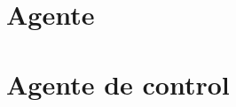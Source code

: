\section{Agente }
\label{sec:ana_switch}

\section{Agente de control }
\label{sec:ana_controller}







